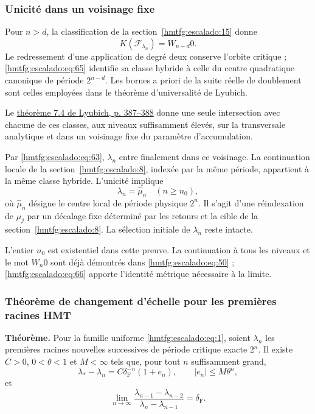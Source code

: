 \subsubsection{Unicité dans un voisinage fixe}
\label{hmtfg:escalado:17.2}

Pour \(n>d\), la classification de la section~\ref{hmtfg:escalado:15} donne
\begin{equation}
K(\mathcal F_{\lambda_n})=W_{n-d}0.
\label{hmtfg:escalado:eq:65}
\end{equation}
Le redressement d’une application de degré deux conserve l’orbite critique ; \eqref{hmtfg:escalado:eq:65} identifie sa classe hybride à celle du centre quadratique canonique de période \(2^{n-d}\). Les bornes a priori de la suite réelle de doublement sont celles employées dans le théorème d’universalité de Lyubich.

Le \href{https://www.maths.tcd.ie/EMIS/journals/Annals/149_2/lyubich.pdf\#page=69}{théorème 7.4 de Lyubich, p. 387–388} donne une seule intersection avec chacune de ces classes, aux niveaux suffisamment élevés, sur la transversale analytique et dans un voisinage fixe du paramètre d’accumulation.

Par \eqref{hmtfg:escalado:eq:63}, \(\lambda_n\) entre finalement dans ce voisinage. La continuation locale de la section~\ref{hmtfg:escalado:8}, indexée par la même période, appartient à la même classe hybride. L’unicité implique
\begin{equation}
\boxed{\lambda_n=\widehat\mu_n\quad(n\ge n_0),}
\label{hmtfg:escalado:eq:66}
\end{equation}
où \(\widehat\mu_n\) désigne le centre local de période physique \(2^n\). Il s’agit d’une réindexation de \(\mu_j\) par un décalage fixe déterminé par les retours et la cible de la section~\ref{hmtfg:escalado:8}. La sélection initiale de \(\lambda_n\) reste intacte.

L’entier \(n_0\) est existentiel dans cette preuve. La continuation à tous les niveaux et le mot \(W_n0\) sont déjà démontrés dans \eqref{hmtfg:escalado:eq:50} ; \eqref{hmtfg:escalado:eq:66} apporte l’identité métrique nécessaire à la limite.

\subsubsection{Théorème de changement d’échelle pour les premières racines HMT}
\label{hmtfg:escalado:17.3}

\textbf{Théorème.} Pour la famille uniforme \eqref{hmtfg:escalado:eq:1}, soient \(\lambda_n\) les premières racines nouvelles successives de période critique exacte \(2^n\). Il existe \(C>0\), \(0<\theta<1\) et \(M<\infty\) tels que, pour tout \(n\) suffisamment grand,
\begin{equation}
\lambda_*-\lambda_n=C\delta_{\mathrm F}^{-n}(1+e_n),
\qquad |e_n|\le M\theta^n,
\label{hmtfg:escalado:eq:67}
\end{equation}
et
\begin{equation}
\boxed{\lim_{n\to\infty}
\frac{\lambda_{n-1}-\lambda_{n-2}}
{\lambda_n-\lambda_{n-1}}=\delta_{\mathrm F}.}
\label{hmtfg:escalado:eq:68}
\end{equation}

